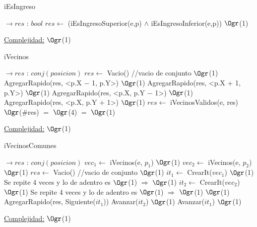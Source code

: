 \begin{Representacion}
\begin{Algoritmos}
	\begin{algorithm}[H]
		\caption{iEsIngreso}
		\begin{algorithmic}[1]
			 $\to res$ : $bool$
				\State $res \gets$ (iEsIngresoSuperior(e,p) $\land$ iEsIngresoInferior(e,p)) \Comment $\Ogr$(1)
			\EndProcedure		
		\end{algorithmic}
		\underline{Complejidad:} $\Ogr$(1)
	\end{algorithm}
	
	\begin{algorithm}[H]
		\caption{iVecinos}
		\begin{algorithmic}[1]
			 $\to res$ : $conj(posicion)$
				\State $res \gets$ Vacio() //vacio de conjunto \Comment $\Ogr$(1)
				\State AgregarRapido(res, <p.X $-$ 1, p.Y>) \Comment $\Ogr$(1)
				\State AgregarRapido(res, <p.X $+$ 1, p.Y>) \Comment $\Ogr$(1)
				\State AgregarRapido(res, <p.X, p.Y $-$ 1>) \Comment $\Ogr$(1)
				\State AgregarRapido(res, <p.X, p.Y $+$ 1>) \Comment $\Ogr$(1)
				\State $res \gets$ iVecinosValidos(e, res) \Comment $\Ogr$($\#$res) $=$ $\Ogr$(4) $=$ $\Ogr$(1)				
			\EndProcedure		
		\end{algorithmic}
		\underline{Complejidad:} $\Ogr$(1)
	\end{algorithm}
		
	\begin{algorithm}[H]
		\caption{iVecinosComunes}
		\begin{algorithmic}[1]
			 $\to res$ : $conj(posicion)$
				\State $vec_1 \gets$ iVecinos(e, $p_1$) \Comment $\Ogr$(1)
				\State $vec_2 \gets$ iVecinos(e, $p_2$) \Comment $\Ogr$(1)
				\State $res \gets$ Vacio() //vacio de conjunto \Comment $\Ogr$(1)
				\State $it_1 \gets$ CrearIt($vec_1$) \Comment $\Ogr$(1)
				 \Comment Se repite 4 veces y lo de adentro es $\Ogr$(1) $\Rightarrow$ $\Ogr$(1)	
					\State $it_2 \gets$ CrearIt($vec_2$) \Comment $\Ogr$(1)
					 \Comment Se repite 4 veces y lo de adentro es $\Ogr$(1) $\Rightarrow$ $\Ogr$(1)
						 \Comment $\Ogr$(1)
							\State AgregarRapido(res, Siguiente($it_1$))
						\EndIf
						\State Avanzar($it_2$) \Comment $\Ogr$(1)
					\EndWhile
					\State Avanzar($it_1$) \Comment $\Ogr$(1)
				\EndWhile		
			\EndProcedure		
		\end{algorithmic}
		\underline{Complejidad:} $\Ogr$(1)
	\end{algorithm}
			

\end{Algoritmos}
\end{Representacion}
